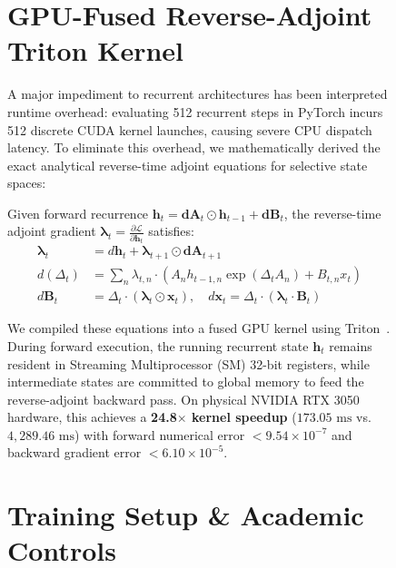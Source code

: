 \documentclass[10pt,twocolumn,letterpaper]{article}
\begin{document}
\begin{figure}[t]
\section{GPU-Fused Reverse-Adjoint Triton Kernel}
\label{sec:triton}

A major impediment to recurrent architectures has been interpreted runtime overhead: evaluating 512 recurrent steps in PyTorch incurs 512 discrete CUDA kernel launches, causing severe CPU dispatch latency. To eliminate this overhead, we mathematically derived the exact analytical reverse-time adjoint equations for selective state spaces:

Given forward recurrence $\mathbf{h}_t = \mathbf{dA}_t \odot \mathbf{h}_{t-1} + \mathbf{dB}_t$, the reverse-time adjoint gradient $\boldsymbol{\lambda}_t = \frac{\partial \mathcal{L}}{\partial \mathbf{h}_t}$ satisfies:
\begin{align}
    \boldsymbol{\lambda}_t &= d\mathbf{h}_t + \boldsymbol{\lambda}_{t+1} \odot \mathbf{dA}_{t+1} \\
    d(\Delta_t) &= \sum_n \lambda_{t, n} \cdot \left(A_n h_{t-1, n} \exp(\Delta_t A_n) + B_{t, n} x_t\right) \\
    d\mathbf{B}_t &= \Delta_t \cdot (\boldsymbol{\lambda}_t \odot \mathbf{x}_t), \quad d\mathbf{x}_t = \Delta_t \cdot (\boldsymbol{\lambda}_t \cdot \mathbf{B}_t)
\end{align}

We compiled these equations into a fused GPU kernel using Triton~\cite{tillet2019triton}. During forward execution, the running recurrent state $\mathbf{h}_t$ remains resident in Streaming Multiprocessor (SM) 32-bit registers, while intermediate states are committed to global memory to feed the reverse-adjoint backward pass. On physical NVIDIA RTX 3050 hardware, this achieves a \textbf{24.8$\times$ kernel speedup} ($173.05\text{ ms}$ vs. $4,289.46\text{ ms}$) with forward numerical error $< 9.54 \times 10^{-7}$ and backward gradient error $< 6.10 \times 10^{-5}$.

\section{Training Setup \& Academic Controls}
\label{sec:setup}


\end{figure}
\end{document}

